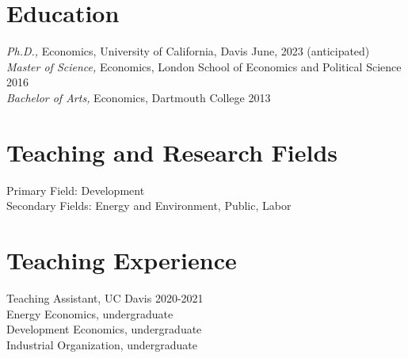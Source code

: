 \documentclass[10pt]{res} %
\begin{document}
\begin{resume}


\section{Education}
{\sl Ph.D.,} Economics, University of California, Davis  \hfill June, 2023 (anticipated) \\
{\sl Master of Science,} Economics, London School of Economics and Political Science \hfill 2016 \\
{\sl Bachelor of Arts,} Economics, Dartmouth College \hfill 2013 \\


 \section{Teaching and Research Fields}
 Primary Field: Development\\
 Secondary Fields: Energy and Environment, Public, Labor %
\section{Teaching Experience} 
Teaching Assistant, UC Davis  \hfill 2020-2021 \\
\hspace*{6mm} Energy Economics, undergraduate \\
\hspace*{6mm} Development Economics, undergraduate \\
\hspace*{6mm} Industrial Organization, undergraduate  \\


\end{resume}
\end{document}
